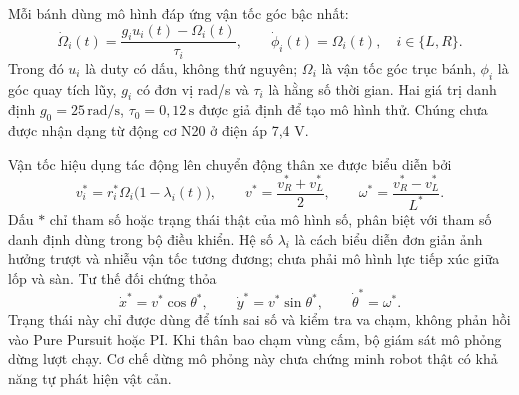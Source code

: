 \documentclass[12pt,a4paper,oneside]{report}
\begin{document}
Mỗi bánh dùng mô hình đáp ứng vận tốc góc bậc nhất:
\begin{equation}
  \dot\Omega_i(t)=\frac{g_i u_i(t)-\Omega_i(t)}{\tau_i},
  \qquad \dot\phi_i(t)=\Omega_i(t),\quad i\in\{L,R\}.
  \label{eq:c4-motor-model}
\end{equation}
Trong đó \(u_i\) là duty có dấu, không thứ nguyên; \(\Omega_i\) là vận tốc góc trục bánh, \(\phi_i\) là góc quay tích lũy, \(g_i\) có đơn vị rad/s và \(\tau_i\) là hằng số thời gian. Hai giá trị danh định \(g_0=25\,\mathrm{rad/s}\), \(\tau_0=0{,}12\,\mathrm{s}\) được giả định để tạo mô hình thử. Chúng chưa được nhận dạng từ động cơ N20 ở điện áp 7,4 V.

Vận tốc hiệu dụng tác động lên chuyển động thân xe được biểu diễn bởi
\begin{equation}
  v_i^{*}=r_i^{*}\Omega_i\bigl(1-\lambda_i(t)\bigr),\qquad
  v^{*}=\frac{v_R^{*}+v_L^{*}}{2},\qquad
  \omega^{*}=\frac{v_R^{*}-v_L^{*}}{L^{*}}.
  \label{eq:c4-effective-velocity}
\end{equation}
Dấu \(*\) chỉ tham số hoặc trạng thái thật của mô hình số, phân biệt với tham số danh định dùng trong bộ điều khiển. Hệ số \(\lambda_i\) là cách biểu diễn đơn giản ảnh hưởng trượt và nhiễu vận tốc tương đương; chưa phải mô hình lực tiếp xúc giữa lốp và sàn. Tư thế đối chứng thỏa
\begin{equation}
  \dot x^{*}=v^{*}\cos\theta^{*},\qquad
  \dot y^{*}=v^{*}\sin\theta^{*},\qquad
  \dot\theta^{*}=\omega^{*}.
  \label{eq:c4-truth-kinematics}
\end{equation}
Trạng thái này chỉ được dùng để tính sai số và kiểm tra va chạm, không phản hồi vào Pure Pursuit hoặc PI. Khi thân bao chạm vùng cấm, bộ giám sát mô phỏng dừng lượt chạy. Cơ chế dừng mô phỏng này chưa chứng minh robot thật có khả năng tự phát hiện vật cản.
\end{document}

